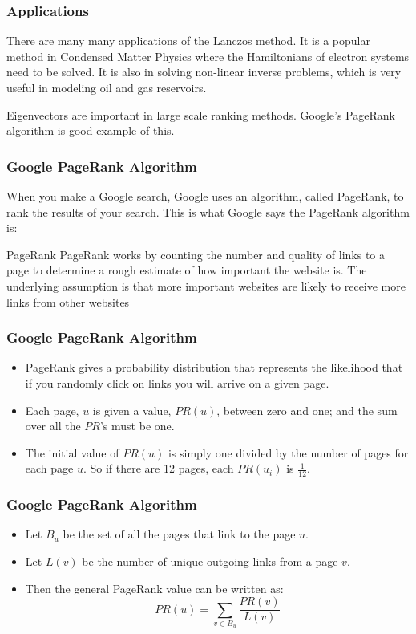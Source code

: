 \documentclass[pdf]{beamer}
\begin{document}
\begin{frame}
\tableofcontents[currentsection]
\end{frame}


\begin{frame}
\frametitle{Applications}
There are many many applications of the Lanczos method. It is a popular method in Condensed Matter Physics where the Hamiltonians of electron systems need to be solved. It is also in solving non-linear inverse problems, which is very useful in modeling oil and gas reservoirs.

Eigenvectors are important in large scale ranking methods. Google's PageRank algorithm is good example of this. 
\end{frame}


\begin{frame}
\frametitle{Google PageRank Algorithm}

When you make a Google search, Google uses an algorithm, called PageRank, to rank the results of your search. This is what Google says the PageRank algorithm is:

\begin{exampleblock}{PageRank}
PageRank works by counting the number and quality of links to a page to determine a rough estimate of how important the website is. The underlying assumption is that more important websites are likely to receive more links from other websites 
\end{exampleblock}

\end{frame}



\begin{frame}
\frametitle{Google PageRank Algorithm}
\begin{itemize}
\item PageRank gives a probability distribution that represents the likelihood that if you randomly click on links you will arrive on a given page. 
\item Each page, $u$ is given a value, $PR(u)$, between zero and one; and the sum over all the $PR$'s must be one.
\item The initial value of $PR(u)$ is simply one divided by the number of pages for each page $u$. So if there are 12 pages, each $PR(u_i)$ is $\frac{1}{12}$.
\end{itemize}
\end{frame}




\begin{frame}
\frametitle{Google PageRank Algorithm}
\begin{itemize}
\item Let $B_u$ be the set of all the pages that link to the page $u$.
\item Let $L(v)$ be the number of unique outgoing links from a page $v$.
\item Then the general PageRank value can be written as: \[PR(u) = \sum_{v \in B_u} \frac{PR(v)}{L(v)} \]
\end{itemize}
\end{frame}
\end{document}
